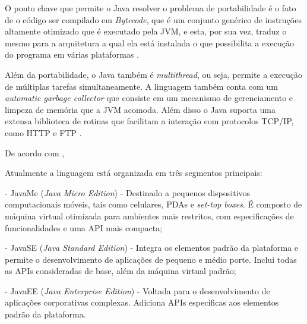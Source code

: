
\par O ponto chave que
permite o Java resolver o problema de portabilidade é o fato de o código ser
compilado em \textit{Bytecode}, que é um conjunto genérico de instruções
altamente otimizado que é executado pela JVM, e esta, por sua vez, traduz o
mesmo para a arquitetura a qual ela está instalada o que possibilita a execução do programa
em várias plataformas \cite{livro_java_complete_references}.


% 
% 
% 


\par Além da portabilidade, o Java também é \textit{multithread}, ou seja,
permite a execução de múltiplas tarefas simultaneamente. A linguagem também
conta com um \textit{automatic garbage collector} que consiste em um mecanismo
de gerenciamento e limpeza de memória que a JVM acomoda. Além disso o Java
suporta uma extensa biblioteca de rotinas que facilitam a interação com protocolos 
TCP/IP, como HTTP e FTP \cite{livro_java_complete_references}.

\par De acordo com , 

\begin{citacao} Atualmente a linguagem está organizada em três segmentos
principais:


	- JavaMe (\textit{Java Micro Edition}) - Destinado a pequenos dispositivos
	computacionais móveis, tais como celulares, PDAs e \textit{set-top boxes}. É
	composto de máquina virtual otimizada para ambientes mais restritos, com
	especificações de funcionalidades e uma API mais compacta;
	  
	- JavaSE (\textit{Java Standard Edition}) - Integra os elementos padrão
	da plataforma e permite o desenvolvimento de aplicações de pequeno e médio porte. Inclui todas as APIs consideradas de base,
além da máquina virtual padrão;

	- JavaEE (\textit{Java Enterprise Edition}) - Voltada para o desenvolvimento
	de aplicações corporativas complexas. Adiciona APIs específicas aos elementos
	padrão da plataforma.
	

\end{citacao}


